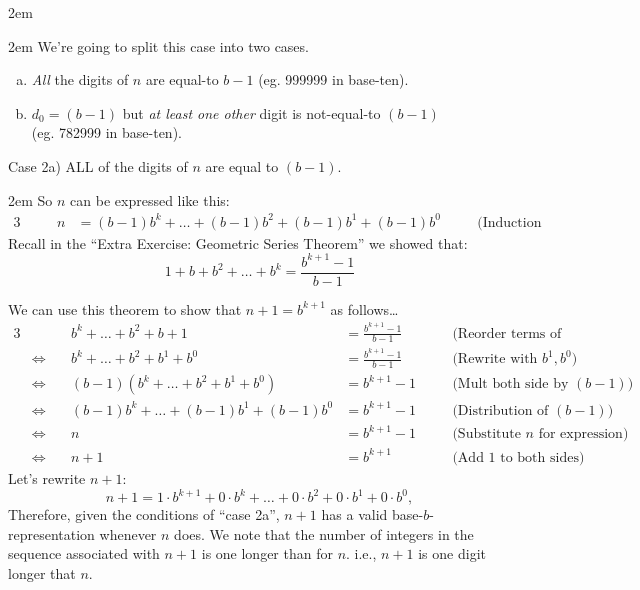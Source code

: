\documentclass{article}
\newenvironment{jprIn}{\begin{adjustwidth}{2em}{}}{\end{adjustwidth}}
\begin{document}
\begin{jprIn}
\begin{jprIn}
We're going to split this case into two cases.

\begin{enumerate}[a)]
\item \emph{All} the digits of $n$ are equal-to $b{-}1$ (eg. 999999 in base-ten).
\item $d_0=(b-1)$ but \emph{at least one other} digit is not-equal-to $(b-1)$\\
(eg. 782999 in base-ten).
\end{enumerate}
%

Case 2a) ALL of the digits of $n$ are equal to $(b-1)$.
\begin{jprIn}
So $n$ can be expressed like this:
\begin{alignat*}{3}
  &\quad&n
  &= (b{-}1)b^k+\dots{}+(b{-}1)b^2+(b{-}1)b^1+(b{-}1)b^0 &&\quad\text{(Induction Assumption)}
\end{alignat*}
Recall in the ``Extra Exercise: Geometric Series Theorem''
we showed that:
\[1+b+b^2+\dots{}+b^k=\frac{b^{k+1}-1}{b-1}\]

We can use this theorem to show that $n+1=b^{k+1}$ as follows\dots
\smallskip
{\small
\begin{alignat*}{3}
  &&b^k+\dots{}+b^2+b+1
  &= \frac{b^{k+1}-1}{b-1} &&\quad\text{(Reorder terms of G.S.Thm.)}\\
  &\Leftrightarrow\quad
  &b^k+\dots{}+b^2+b^1+b^0
  &= \frac{b^{k+1}-1}{b-1} &&\quad\text{(Rewrite with }b^1, b^0\text{)}\\
  &\Leftrightarrow\quad
  &(b-1)(b^k+\dots{}+b^2+b^1+b^0)
  &= b^{k+1}-1 &&\quad\text{(Mult both side by }(b{-}1)\text{)}\\
  &\Leftrightarrow\quad
  &(b{-}1)b^k+\dots{}+(b{-}1)b^1+(b{-}1)b^0
  &= b^{k+1}-1 &&\quad\text{(Distribution of }(b{-}1)\text{)}\\
  &\Leftrightarrow\quad
  &n
  &= b^{k+1}-1 &&\quad\text{(Substitute }n\text{ for expression)}\\
  &\Leftrightarrow\quad
  &n+1
  &= b^{k+1} &&\quad\text{(Add 1 to both sides)}
\end{alignat*}
}Let's rewrite $n+1$:
\[n+1= 1\cdot{}b^{k+1}+0\cdot{}b^{k}+\dots{}+0\cdot{}b^2+0\cdot{}b^1+0\cdot{}b^0,\]
Therefore, given the conditions of ``case 2a'', $n+1$ has
a valid base-$b$-representation whenever $n$ does.
We note that
the number of integers in the sequence associated
with $n+1$ is one longer than for $n$. i.e., $n+1$ is one digit longer that $n$.


\end{jprIn}
\end{jprIn}
\end{jprIn}
\end{document}
